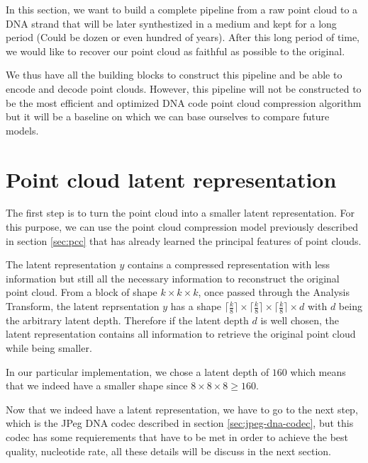 

In this section, we want to build a complete pipeline from a raw point cloud to a DNA strand that will be later synthestized in a medium and kept for a long period (Could be dozen or even hundred of years). After this long period of time, we would like to recover our point cloud as faithful as possible to the original. 

We thus have all the building blocks to construct this pipeline and be able to encode and decode point clouds. However, this pipeline will not be constructed to be the most efficient and optimized DNA code point cloud compression algorithm but it will be a baseline on which we can base ourselves to compare future models. 



\section{Point cloud latent representation}

The first step is to turn the point cloud into a smaller latent representation. For this purpose, we can use the point cloud compression model previously described in section \ref{sec:pcc} that has already learned the principal features of point clouds. 

The latent representation $y$ contains a compressed representation with less information but still all the necessary information to reconstruct the original point cloud. From a block of shape $k \times k \times k$, once passed through the Analysis Transform, the latent reprsentation $y$ has a shape $\lceil\frac{k}{8}\rceil \times \lceil\frac{k}{8}\rceil \times \lceil\frac{k}{8}\rceil \times d$ with $d$ being the arbitrary latent depth. Therefore if the latent depth $d$ is well chosen, the latent representation contains all information to retrieve the original point cloud while being smaller.

In our particular implementation, we chose a latent depth of $160$ which means that we indeed have a smaller shape since $8 \times 8 \times 8 \geq 160$. 

Now that we indeed have a latent representation, we have to go to the next step, which is the JPeg DNA codec described in section \ref{sec:jpeg-dna-codec}, but this codec has some requierements that have to be met in order to achieve the best quality, nucleotide rate, all these details will be discuss in the next section.

